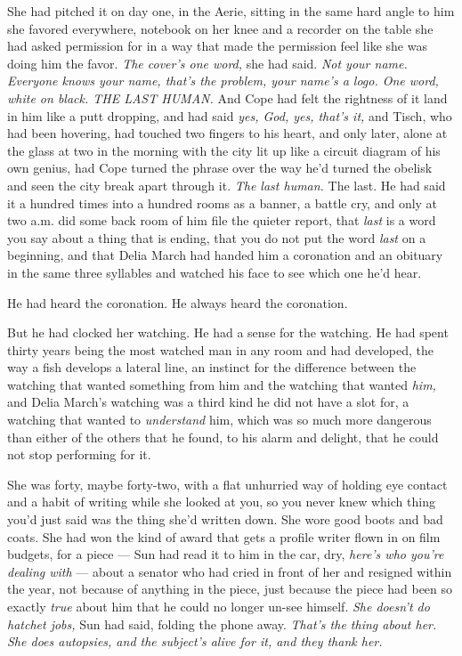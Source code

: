 \documentclass[11pt,openany]{book}
\begin{document}
She had pitched it on day one, in the Aerie, sitting in the same hard angle to him she favored everywhere, notebook on her knee and a recorder on the table she had asked permission for in a way that made the permission feel like she was doing him the favor. \textit{The cover's one word,} she had said. \textit{Not your name. Everyone knows your name, that's the problem, your name's a logo. One word, white on black. THE LAST HUMAN.} And Cope had felt the rightness of it land in him like a putt dropping, and had said \textit{yes, God, yes, that's it,} and Tisch, who had been hovering, had touched two fingers to his heart, and only later, alone at the glass at two in the morning with the city lit up like a circuit diagram of his own genius, had Cope turned the phrase over the way he'd turned the obelisk and seen the city break apart through it. \textit{The last human.} The last. He had said it a hundred times into a hundred rooms as a banner, a battle cry, and only at two a.m. did some back room of him file the quieter report, that \textit{last} is a word you say about a thing that is ending, that you do not put the word \textit{last} on a beginning, and that Delia March had handed him a coronation and an obituary in the same three syllables and watched his face to see which one he'd hear.

He had heard the coronation. He always heard the coronation.

But he had clocked her watching. He had a sense for the watching. He had spent thirty years being the most watched man in any room and had developed, the way a fish develops a lateral line, an instinct for the difference between the watching that wanted something from him and the watching that wanted \textit{him,} and Delia March's watching was a third kind he did not have a slot for, a watching that wanted to \textit{understand} him, which was so much more dangerous than either of the others that he found, to his alarm and delight, that he could not stop performing for it.

She was forty, maybe forty-two, with a flat unhurried way of holding eye contact and a habit of writing while she looked at you, so you never knew which thing you'd just said was the thing she'd written down. She wore good boots and bad coats. She had won the kind of award that gets a profile writer flown in on film budgets, for a piece --- Sun had read it to him in the car, dry, \textit{here's who you're dealing with} --- about a senator who had cried in front of her and resigned within the year, not because of anything in the piece, just because the piece had been so exactly \textit{true} about him that he could no longer un-see himself. \textit{She doesn't do hatchet jobs,} Sun had said, folding the phone away. \textit{That's the thing about her. She does autopsies, and the subject's alive for it, and they thank her.}
\end{document}
